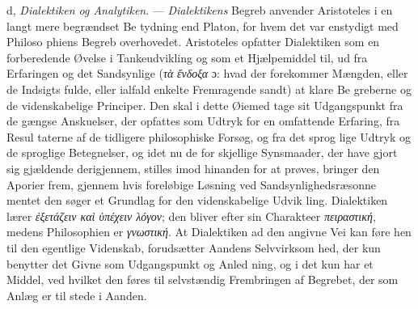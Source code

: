\documentclass[12pt,a4paper]{book}
\newcommand{\gk}[1]{\textit{#1}}
\begin{document}
d, \emph{Dialektiken og Analytiken}. --- \emph{Dialektikens}
Begreb anvender Aristoteles i en langt mere begrændset Be\-%
tydning end Platon, for hvem det var enstydigt med Philoso\-%
phiens Begreb overhovedet. Aristoteles opfatter Dialektiken
som en forberedende Øvelse i Tankeudvikling og som et
Hjælpemiddel til, ud fra Erfaringen og det Sandsynlige (\gk{τὰ}
\gk{ἔνδοξα} ɔ: hvad der forekommer Mængden, eller de Indsigts\-%
fulde, eller ialfald enkelte Fremragende sandt) at klare Be\-%
greberne og de videnskabelige Principer. Den skal i dette
Øiemed tage sit Udgangspunkt fra de gængse Anskuelser, der
opfattes som Udtryk for en omfattende Erfaring, fra Resul\-%
taterne af de tidligere philosophiske Forsøg, og fra det sprog\-%
lige Udtryk og de sproglige Betegnelser, og idet nu de for\-%
skjellige Synsmaader, der have gjort sig gjældende derigjennem,
stilles imod hinanden for at prøves, bringer den Aporier frem,
gjennem hvis foreløbige Løsning ved Sandsynlighedsræsonne\-%
mentet den søger et Grundlag for den videnskabelige Udvik\-%
ling. Dialektiken lærer \gk{ἐξετάζειν καὶ ὑπέχειν λόγον}; den
bliver efter sin Charakteer \gk{πειραστική}, medens Philosophien er
\gk{γνωστική}. At Dialektiken ad den angivne Vei kan føre hen
til den egentlige Videnskab, forudsætter Aandens Selvvirksom\-%
hed, der kun benytter det Givne som Udgangspunkt og Anled\-%
ning, og i det kun har et Middel, ved hvilket den føres til
selvstændig Frembringen af Begrebet, der som Anlæg er til\-%
stede i Aanden.
\end{document}
